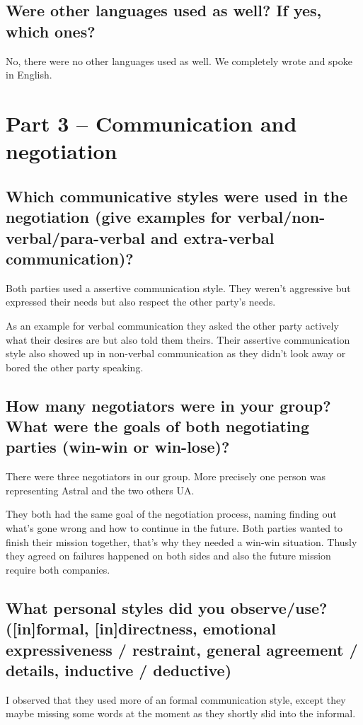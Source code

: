 \documentclass[11pt,fleqn]{book} %
\begin{document}
\subsection{Were other languages used as well? If yes, which ones?}
No, there were no other languages used as well. We completely wrote and spoke in English.

\section{Part 3 – Communication and negotiation}
\subsection{Which communicative styles were used in the negotiation (give examples for verbal/non-verbal/para-verbal and extra-verbal communication)?}
Both parties used a assertive communication style. They weren't aggressive but expressed their needs but also respect the other party's needs.

As an example for verbal communication they asked the other party actively what their desires are but also told them theirs.
Their assertive communication style also showed up in non-verbal communication as they didn't look away or bored the other party speaking.

\subsection{How many negotiators were in your group? What were the goals of both negotiating parties (win-win or win-lose)?}
There were three negotiators in our group. More precisely one person was representing Astral and the two others UA.

They both had the same goal of the negotiation process, naming finding out what's gone wrong and how to continue in the future. 
Both parties wanted to finish their mission together, that's why they needed a win-win situation. Thusly they agreed on failures happened on both sides and also the future mission require both companies.

\subsection{What personal styles did you observe/use? ([in]formal, [in]directness, emotional expressiveness / restraint, general agreement / details, inductive / deductive)}
I observed that they used more of an formal communication style, except they maybe missing some words at the moment as they shortly slid into the informal.
\end{document}
